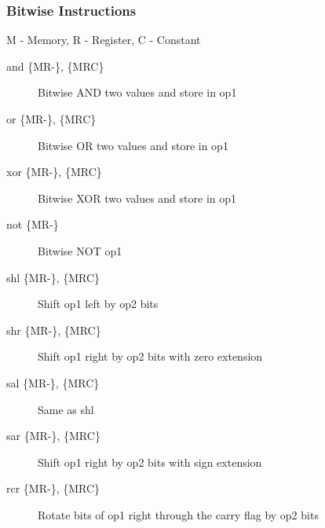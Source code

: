 \subsubsection*{Bitwise Instructions}
M - Memory, R - Register, C - Constant
\begin{description}
    \item[and \{MR-\}, \{MRC\}] Bitwise AND two values and store in op1
    \item[or \{MR-\}, \{MRC\}] Bitwise OR two values and store in op1
    \item[xor \{MR-\}, \{MRC\}] Bitwise XOR two values and store in op1
    \item[not \{MR-\}] Bitwise NOT op1
    \item[shl \{MR-\}, \{MRC\}] Shift op1 left by op2 bits
    \item[shr \{MR-\}, \{MRC\}] Shift op1 right by op2 bits with zero extension
    \item[sal \{MR-\}, \{MRC\}] Same as shl
    \item[sar \{MR-\}, \{MRC\}] Shift op1 right by op2 bits with sign extension
    \item[rcr \{MR-\}, \{MRC\}] Rotate bits of op1 right through the carry flag by op2 bits
\end{description}